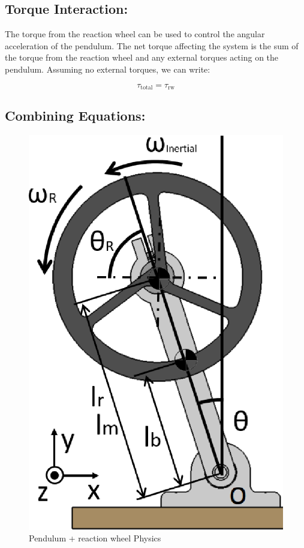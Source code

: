 \documentclass{article}
\begin{document}
\begin{multicols}{2}
\subsection{Torque Interaction:}

The torque from the reaction wheel can be used to control the angular acceleration of the pendulum. The net torque affecting the system is the sum of the torque from the reaction wheel and any external torques acting on the pendulum. Assuming no external torques, we can write:

\[
\tau_{\text{total}} = \tau_{\text{rw}}
\]

\subsection{Combining Equations:}

\begin{figure}[H]
\centering
\includegraphics[scale=0.195]{inverted pendulum reactionwheel}
\caption{Pendulum + reaction wheel Physics}
\label{fig:Pendulum + reaction wheel Physics}
\end{figure}


\end{multicols}
\end{document}

